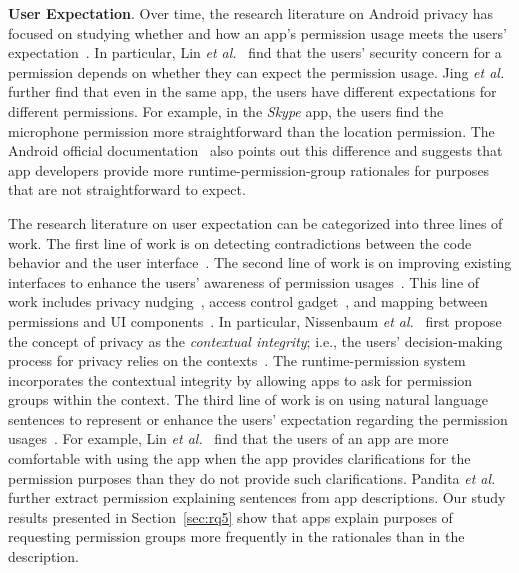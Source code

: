 \textbf{User Expectation}. Over time, the research literature on Android privacy has focused on studying whether and how an app's permission usage meets the users' expectation~\cite{conf/huc/LinSALHZ12,conf/icse/HuangZTWL14,conf/uss/PanditaXYEX13,conf/icse/GorlaTGZ14,conf/chi/AlmuhimediSSAAG15,Nissenbaum:2004,conf/uss/WijesekeraBHEWB15,conf/sp/RoesnerKMPWC12,conf/chi/KelleyCS13}. 
In particular, Lin \emph{et al.}~\cite{conf/huc/LinSALHZ12} find that the users' security concern for a permission depends on whether they can expect the permission usage. Jing \emph{et al.}~\cite{conf/codaspy/JingAZH14} further find that even in the same app, the users have different expectations for different permissions. For example, in the \emph{Skype} app, the users find the microphone permission more straightforward than the location permission. The Android official documentation~\cite{shouldshow} also points out this difference and suggests that app developers provide more runtime-permission-group rationales for purposes that are not straightforward to expect. 

The research literature on user expectation can be categorized into three lines of work. The first line of work is on detecting contradictions between the code behavior and the user interface~\cite{conf/icse/HuangZTWL14,conf/wisec/AndowALESX17}. The second line of work is on improving existing interfaces to enhance the users' awareness of permission usages~\cite{conf/chi/AlmuhimediSSAAG15,conf/sp/RoesnerKMPWC12,conf/huc/LiGC16,Nissenbaum:2004,Micinski2017UserIA,conf/uss/WijesekeraBHEWB15}. 
This line of work includes privacy nudging~\cite{conf/chi/AlmuhimediSSAAG15}, access control gadget~\cite{conf/sp/RoesnerKMPWC12}, and mapping between permissions and UI components~\cite{conf/huc/LiGC16}. 
In particular, Nissenbaum \emph{et al.}~\cite{Nissenbaum:2004} first propose the concept of privacy as the \emph{contextual integrity}; 
i.e., the users' decision-making process for privacy relies on the contexts~\cite{Micinski2017UserIA,conf/uss/WijesekeraBHEWB15,chen2013contextual,background}. 
The runtime-permission system incorporates the contextual integrity by allowing apps to ask for permission groups within the context. 
The third line of work is on using natural language sentences to represent or enhance the users' expectation regarding the permission usages~\cite{conf/huc/LinSALHZ12,conf/uss/PanditaXYEX13,conf/icse/GorlaTGZ14,conf/ccs/QuRZCZC14}. 
For example, Lin \emph{et al.}~\cite{conf/huc/LinSALHZ12} find that the users of an app are more comfortable with using the app when the app provides clarifications for the permission purposes than they do not provide such clarifications. 
Pandita \emph{et al.}~\cite{conf/uss/PanditaXYEX13} further extract permission explaining sentences from app descriptions. 
Our study results presented in Section~\ref{sec:rq5} show that apps explain purposes of requesting permission groups more frequently in the rationales than in the description. 


